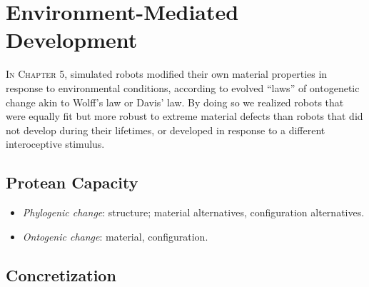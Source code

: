 


\section{Environment-Mediated Development}

\textsc{In Chapter 5,}
simulated robots modified their own material properties
in response to environmental conditions,
according to evolved ``laws'' of ontogenetic change akin to Wolff's law or Davis' law.
By doing so we realized robots that were equally fit but more robust to extreme material defects than robots that did not develop during their lifetimes, or developed in response to a different interoceptive stimulus.


\subsection{Protean Capacity}

\begin{itemize}
    \item \textit{Phylogenic change}: structure; material alternatives, configuration alternatives.
    \item \textit{Ontogenic change}: material, configuration.
\end{itemize}


\subsection{Concretization}


